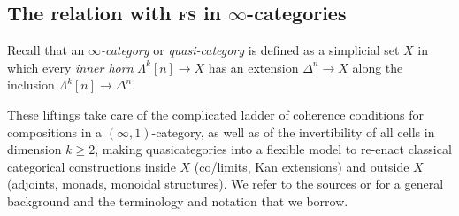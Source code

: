 \subsection{The relation with \textsc{fs} in $\infty$-categories} \label{infty_cat_fs}
Recall that an \emph{$\infty$-category} \cite{HTT} or \emph{quasi-category} \cite{joyal2008notes} is defined as a simplicial set $X$ in which every \emph{inner horn} $\Lambda^k[n] \to X$ has an extension $\Delta^n \to X$ along the inclusion $\Lambda^k[n]\to \Delta^n$. 

These liftings take care of the complicated ladder of coherence conditions for compositions in a $(\infty,1)$-category, as well as of the invertibility of all cells in dimension $k\ge 2$, making quasicategories into a flexible model to re-enact classical categorical constructions inside $X$ (co/limits, Kan extensions) and outside $X$ (adjoints, monads, monoidal structures). We refer to the sources \cite{HTT} or \cite{joyal2008notes} for a general background and the terminology and notation that we borrow.

